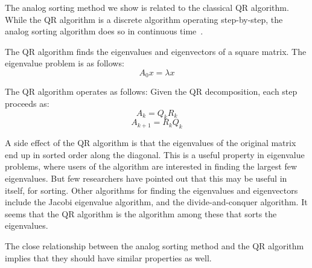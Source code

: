 The analog sorting method we show is related to the classical QR algorithm.
While the QR algorithm is a discrete algorithm operating step-by-step, the analog sorting algorithm does so in continuous time~\cite{deift, chu_realization, chu_flows}.

The QR algorithm finds the eigenvalues and eigenvectors of a square matrix.
The eigenvalue problem is as follows:
\[A_0x = \lambda x\]

The QR algorithm operates as follows:
Given the QR decomposition, each step proceeds as:
\[A_k = Q_k R_k\]
\[A_{k+1} = R_k Q_k\]

A side effect of the QR algorithm is that the eigenvalues of the original matrix end up in sorted order along the diagonal.
This is a useful property in eigenvalue problems, where users of the algorithm are interested in finding the largest few eigenvalues.
But few researchers have pointed out that this may be useful in itself, for sorting.
Other algorithms for finding the eigenvalues and eigenvectors include the Jacobi eigenvalue algorithm, and the divide-and-conquer algorithm.
It seems that the QR algorithm is the algorithm among these that sorts the eigenvalues.

The close relationship between the analog sorting method and the QR algorithm implies that they should have similar properties as well.
